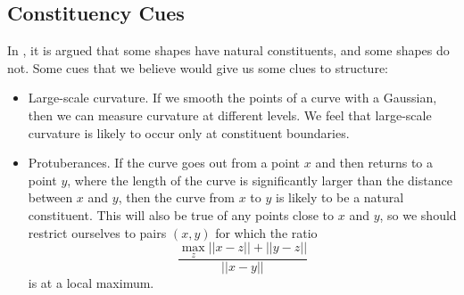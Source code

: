 \subsection{Constituency Cues}
In \cite{basri-jacobs}, it is argued that some shapes have natural
constituents, and some shapes do not. Some cues that we believe would
give us some clues to structure: 
\begin{itemize}
\item Large-scale curvature. If we smooth the points of a curve with a
  Gaussian, then we can measure curvature at different levels. We feel
  that large-scale curvature is likely to occur only at constituent
  boundaries.
\item Protuberances. If the curve goes out from a point $x$ and then
  returns to a point $y$, where the length of the curve is
  significantly larger than the distance between $x$ and $y$, then the
  curve from $x$ to $y$ is likely to be a natural constituent. This
  will also be true of any points close to $x$ and $y$, so we should
  restrict ourselves to pairs $(x,y)$ for which the ratio 
$$\frac{\max_{z}||x-z|| + ||y-z||}{||x-y||}$$
is at a local maximum.
\end{itemize}
